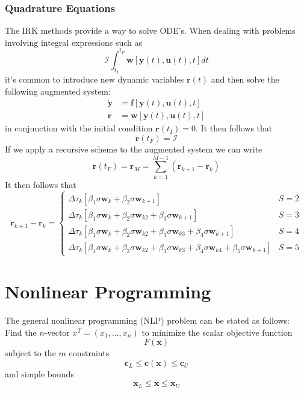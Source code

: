 \documentclass[]{article}
\begin{document}
\subsubsection{Quadrature Equations}
The IRK methods provide a way to solve ODE's. When dealing with problems involving integral expressions such as 
\begin{equation}
    \mathcal{I} \int_{t_I}^{t_F}\mathbf{w}\left[\mathbf{y}(t),\mathbf{u}(t),t\right]dt
\end{equation}
it's common to introduce new dynamic variables $\mathbf{r}(t)$ and then solve the following augmented system:
\begin{align}
    \dot{\mathbf{y}} &= \mathbf{f}\left[\mathbf{y}(t),\mathbf{u}(t),t\right] \\ 
    \dot{\mathbf{r}} &= \mathbf{w}\left[\mathbf{y}(t),\mathbf{u}(t),t\right]
\end{align}
in conjunction with the initial condition $\mathbf{r}(t_I)=0$. It then follows that 
\begin{equation}
    \mathbf{r}(t_F) = \mathcal{I}
\end{equation}
If we apply a recursive scheme to the augmented system we can write 
\begin{equation}
    \mathbf{r}(t_F) = \mathbf{r}_M = \sum_{k=1}^{M-1}\left(\mathbf{r}_{k+1} - \mathbf{r}_k\right)
\end{equation}
It then follows that 
\begin{equation}
    \mathbf{r}_{k+1} - \mathbf{r}_k =
    \left\{ \begin{array}{ll}
        \Delta\tau_k\left[\beta_1\sigma\mathbf{w}_k + \beta_2\sigma\mathbf{w}_{k+1}\right] & S = 2 \\
        \Delta\tau_k\left[\beta_1\sigma\mathbf{w}_k + \beta_2\sigma\mathbf{w}_{k2} + \beta_3\sigma\mathbf{w}_{k+1}\right] & S = 3 \\ 
        \Delta\tau_k\left[\beta_1\sigma\mathbf{w}_k + \beta_2\sigma\mathbf{w}_{k2} + \beta_3\sigma\mathbf{w}_{k3} + \beta_4\sigma\mathbf{w}_{k+1}\right] & S = 4 \\ 
        \Delta\tau_k\left[\beta_1\sigma\mathbf{w}_k + \beta_2\sigma\mathbf{w}_{k2} + \beta_3\sigma\mathbf{w}_{k3} + \beta_4\sigma\mathbf{w}_{k4} + \beta_5\sigma\mathbf{w}_{k+1}\right] & S = 5
    \end{array} \right.
\end{equation}

\section{Nonlinear Programming}
The general nonlinear programming (NLP) problem can be stated as follows: Find the $n$-vector $\textit{x}^T=(x_1,\dots,x_n)$ to minimize the scalar objective function 
\begin{equation}
    F(\mathbf{x})
\end{equation}
subject to the $m$ constraints
\begin{equation}
    \mathbf{c}_L \leq \mathbf{c}(\mathbf{x}) \leq \mathbf{c}_U
\end{equation}
and simple bounds 
\begin{equation}
    \mathbf{x}_L \leq \mathbf{x} \leq \mathbf{x}_U
\end{equation}
\end{document}
